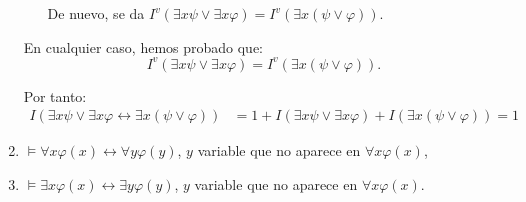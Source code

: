 \begin{ejercicio}
\begin{enumerate}
\begin{itemize}
            De nuevo, se da $I^v(\exists x \psi \vee \exists x \varphi) = I^v(\exists x(\psi \vee \varphi))$.
        \end{itemize}

        En cualquier caso, hemos probado que:
        \begin{equation*}
            I^v(\exists x \psi \vee \exists x \varphi) = I^v(\exists x(\psi \vee \varphi)).
        \end{equation*}

        Por tanto:
        \begin{align*}
            I( \exists x \psi \vee \exists x \varphi \leftrightarrow \exists x(\psi \vee \varphi))
            &= 1+I(\exists x \psi \vee \exists x \varphi)+I(\exists x(\psi \vee \varphi))=1
        \end{align*}


        \item $\models \forall x \varphi(x) \leftrightarrow \forall y \varphi(y)$, $y$ variable que no aparece en $\forall x \varphi(x)$,
        \item $\models \exists x \varphi(x) \leftrightarrow \exists y \varphi(y)$, $y$ variable que no aparece en $\forall x \varphi(x)$.
    \end{enumerate}
\end{ejercicio}

\begin{comment}
\setcounter{ejercicio}{6}
\begin{ejercicio}\label{ej:2.7}
    Demuestra que $\not\models \forall x(\psi \vee \varphi) \rightarrow (\forall x \psi \vee \forall x \varphi)$.
\end{ejercicio}
\end{comment}

\begin{comment}
\setcounter{ejercicio}{7}
\begin{ejercicio}\label{ej:2.8}
    $\models \forall x(\psi \rightarrow \varphi) \rightarrow (\exists x \psi \rightarrow \exists x \varphi)$.
\end{ejercicio}
\end{comment}

\begin{comment}
\setcounter{ejercicio}{8}
\begin{ejercicio}\label{ej:2.9}
    $\models \exists x(\psi \rightarrow \varphi) \rightarrow (\forall x \psi \rightarrow \varphi)$, supuesto que $x$ no aparece libre en $\varphi$ (pista: intenta probar $\{\neg \varphi, \forall x \psi\} \models \forall x \neg (\psi \rightarrow \varphi)$).
\end{ejercicio}
\end{comment}

